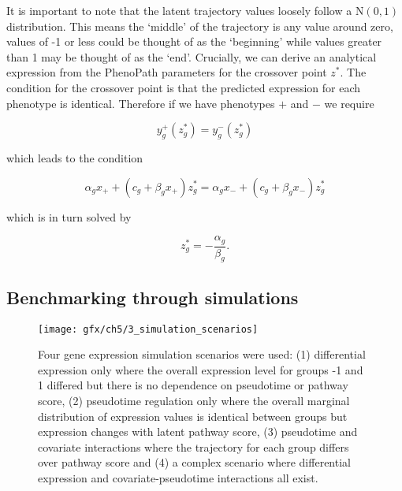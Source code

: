 It is important to note that the latent trajectory values loosely follow a $\text{N}(0, 1)$ distribution. This means the `middle' of the trajectory is any value around zero, values of -1 or less could be thought of as the `beginning' while values greater than 1 may be thought of as the `end'. Crucially, we can derive an analytical expression from the PhenoPath parameters for the crossover point $z^*$. The condition for the crossover point is that the predicted expression for each phenotype is identical. Therefore if we have phenotypes $+$ and $-$ we require

\begin{equation}
  y_g^{+}(z_g^*) = y_g^{-}(z_g^*)
\end{equation}

which leads to the condition

\begin{equation}
  \alpha_g x_{+} + \left( c_g + \beta_g x_{+}\right) z^*_g =
  \alpha_g x_{-} + \left( c_g + \beta_g x_{-}\right) z^*_g
\end{equation}

which is in turn solved by

\begin{equation}
  z^*_g = -\frac{\alpha_g}{\beta_g}.
\end{equation}


\subsection{Benchmarking through simulations}

\begin{figure}
\centering
  \texttt{[image: gfx/ch5/3\_simulation\_scenarios]}
   \caption{Four gene expression simulation scenarios were used: (1) differential expression only where the overall expression level for groups -1 and 1 differed but there is no dependence on pseudotime or pathway score, (2) pseudotime regulation only where the overall marginal distribution of expression values is identical between groups but expression changes with latent pathway score, (3) pseudotime and covariate interactions where the trajectory for each group differs over pathway score and (4) a complex scenario where differential expression and covariate-pseudotime interactions all exist. } \label{fig:simulation_scenarios}
\end{figure}

